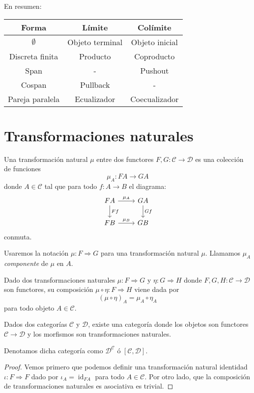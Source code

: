 \documentclass[12pt, twoside]{book}
\newcommand{\newterm}[1]{\index{#1}\emph{#1}}
\newcommand{\cat}{{\mathcal{C}}}
\DeclareMathOperator{\id}{id}
\begin{document}
En resumen:

\begin{center}
\begin{tabular}{ c | c | c }
  Forma & Límite & Colímite\\
  \hline
  $\emptyset$ & Objeto terminal & Objeto inicial \\
  Discreta finita & Producto & Coproducto \\
  Span & - & Pushout \\
  Cospan & Pullback & - \\
  Pareja paralela & Ecualizador & Coecualizador
\end{tabular}
\end{center}

\section{Transformaciones naturales}
\begin{definition}
Una transformación natural $\mu$ entre dos functores $F, G \colon \cat \to \mathcal{D}$ es una colección de funciones
\[ \mu_A \colon F A \to G A \]
donde $A \in \cat$ tal que para todo $f \colon A \to B$ el diagrama:
\[
\begin{tikzcd}
F A \arrow[r,"\mu_A"] \arrow[d,"F f"] & G A \arrow[d,"G f"]\\
F B \arrow[r,"\mu_B"] & G B
\end{tikzcd}
\]
conmuta.
\end{definition}

Usaremos la notación $\mu \colon F \Rightarrow G$ para una transformación natural $\mu$.
Llamamos $\mu_A$ \newterm{componente} de $\mu$ en $A$.

\begin{definition}
Dado dos transformaciones naturales $\mu \colon F \Rightarrow G$ y $\eta \colon G \Rightarrow H$ donde $F,G,H \colon \cat \to \mathcal{D}$ son functores, su composición $\mu \circ \eta \colon F \Rightarrow H$ viene dada por
\[ (\mu \circ \eta)_A = \mu_A \circ \eta_A \]
para todo objeto $A \in \cat$.
\end{definition}

\begin{lemma}
Dados dos categorías $\cat$ y $\mathcal{D}$, existe una categoría donde los objetos son functores $\cat \to \mathcal{D}$ y los morfismos son transformaciones naturales.

Denotamos dicha categoría como $\mathcal{D}^\cat$ ó $[\cat,\mathcal{D}]$.
\end{lemma}
\begin{proof}
Vemos primero que podemos definir una transformación natural identidad $\iota \colon F \Rightarrow F$ dado por $\iota_A = \id_{F A}$ para todo $A \in \cat$.
Por otro lado, que la composición de transformaciones naturales es asociativa es trivial.
\end{proof}
\end{document}
